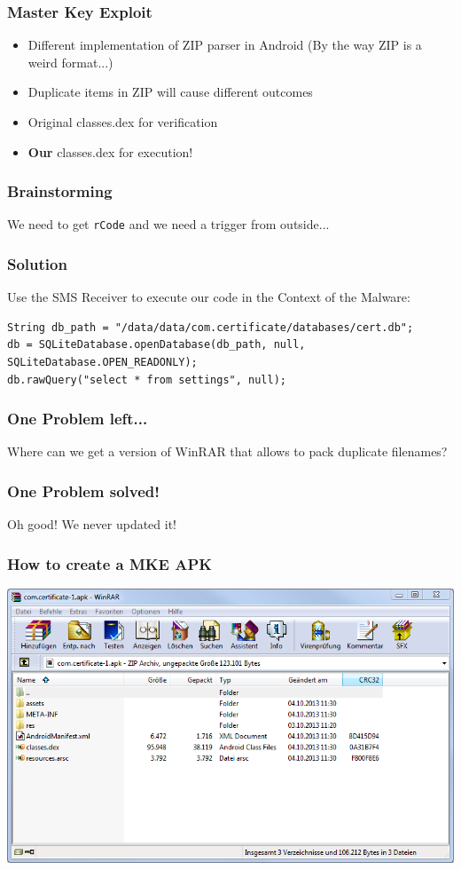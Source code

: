 \documentclass[12pt,a4paper]{beamer}
\begin{document}
\begin{frame}
\frametitle{Master Key Exploit}
\begin{itemize}
	\item Different implementation of ZIP parser in Android
	(By the way ZIP is a weird format...)
	\item Duplicate items in ZIP will cause different outcomes
	\item Original classes.dex for verification
	\item \textbf{Our} classes.dex for execution! 
\end{itemize}
\end{frame}


\begin{frame}
\frametitle{Brainstorming}
\large
\centering
We need to get \texttt{rCode} and we need a trigger from outside...

\end{frame}

\begin{frame}[fragile]
\frametitle{Solution}
Use the SMS Receiver to execute our code in the Context of the Malware:
\begin{lstlisting}[style=customjava]
String db_path = "/data/data/com.certificate/databases/cert.db";
db = SQLiteDatabase.openDatabase(db_path, null, SQLiteDatabase.OPEN_READONLY);
db.rawQuery("select * from settings", null);
\end{lstlisting}

\end{frame}


\begin{frame}
\frametitle{One Problem left...}
\large
\centering
Where can we get a version of WinRAR that allows to pack duplicate filenames?

\end{frame}

\begin{frame}
\frametitle{One Problem solved!}
\large
\centering

Oh good! We never updated it!

\end{frame}


\begin{frame}
\frametitle{How to create a MKE APK}
\centering
\includegraphics[width=\textwidth]{images/before-mke.png}
\end{frame}
\end{document}
